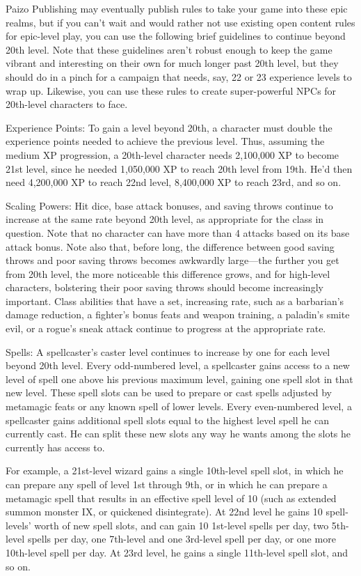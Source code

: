 Paizo Publishing may eventually publish rules to take your game into these epic realms, but if you can't wait and would rather not use existing open content rules for epic-level play, you can use the following brief guidelines to continue beyond 20th level. Note that these guidelines aren't robust enough to keep the game vibrant and interesting on their own for much longer past 20th level, but they should do in a pinch for a campaign that needs, say, 22 or 23 experience levels to wrap up. Likewise, you can use these rules to create super-powerful NPCs for 20th-level characters to face.
				
Experience Points: To gain a level beyond 20th, a character must double the experience points needed to achieve the previous level. Thus, assuming the medium XP progression, a 20th-level character needs 2,100,000 XP to become 21st level, since he needed 1,050,000 XP to reach 20th level from 19th. He'd then need 4,200,000 XP to reach 22nd level, 8,400,000 XP to reach 23rd, and so on.
				
Scaling Powers: Hit dice, base attack bonuses, and saving throws continue to increase at the same rate beyond 20th level, as appropriate for the class in question. Note that no character can have more than 4 attacks based on its base attack bonus. Note also that, before long, the difference between good saving throws and poor saving throws becomes awkwardly large---the further you get from 20th level, the more noticeable this difference grows, and for high-level characters, bolstering their poor saving throws should become increasingly important. Class abilities that have a set, increasing rate, such as a barbarian's damage reduction, a fighter's bonus feats and weapon training, a paladin's smite evil, or a rogue's sneak attack continue to progress at the appropriate rate.
				
Spells: A spellcaster's caster level continues to increase by one for each level beyond 20th level. Every odd-numbered level, a spellcaster gains access to a new level of spell one above his previous maximum level, gaining one spell slot in that new level. These spell slots can be used to prepare or cast spells adjusted by metamagic feats or any known spell of lower levels. Every even-numbered level, a spellcaster gains additional spell slots equal to the highest level spell he can currently cast. He can split these new slots any way he wants among the slots he currently has access to.
				
For example, a 21st-level wizard gains a single 10th-level spell slot, in which he can prepare any spell of level 1st through 9th, or in which he can prepare a metamagic spell that results in an effective spell level of 10 (such as extended summon monster IX, or quickened disintegrate). At 22nd level he gains 10 spell-levels' worth of new spell slots, and can gain 10 1st-level spells per day, two 5th-level spells per day, one 7th-level and one 3rd-level spell per day, or one more 10th-level spell per day. At 23rd level, he gains a single 11th-level spell slot, and so on.
				
